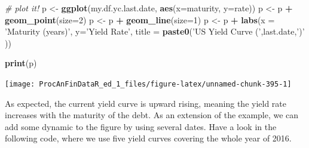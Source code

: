 \documentclass[11pt,]{book}
\newenvironment{Shaded}{\begin{snugshade}}{\end{snugshade}}
\newcommand{\KeywordTok}[1]{\textcolor[rgb]{0.27,0.27,0.27}{\textbf{#1}}}
\newcommand{\DataTypeTok}[1]{\textcolor[rgb]{0.27,0.27,0.27}{#1}}
\newcommand{\DecValTok}[1]{\textcolor[rgb]{0.06,0.06,0.06}{#1}}
\newcommand{\StringTok}[1]{\textcolor[rgb]{0.5,0.5,0.5}{#1}}
\newcommand{\CommentTok}[1]{\textcolor[rgb]{0.56,0.35,0.01}{\textit{#1}}}
\newcommand{\OperatorTok}[1]{\textcolor[rgb]{0.81,0.36,0.00}{\textbf{#1}}}
\newcommand{\NormalTok}[1]{#1}
\begin{document}
\begin{Shaded}
\begin{Highlighting}[]
\CommentTok{# plot it!}
\NormalTok{p <-}\StringTok{ }\KeywordTok{ggplot}\NormalTok{(my.df.yc.last.date, }\KeywordTok{aes}\NormalTok{(}\DataTypeTok{x=}\NormalTok{maturity, }\DataTypeTok{y=}\NormalTok{rate))}
\NormalTok{p <-}\StringTok{ }\NormalTok{p }\OperatorTok{+}\StringTok{ }\KeywordTok{geom_point}\NormalTok{(}\DataTypeTok{size=}\DecValTok{2}\NormalTok{)}
\NormalTok{p <-}\StringTok{ }\NormalTok{p }\OperatorTok{+}\StringTok{ }\KeywordTok{geom_line}\NormalTok{(}\DataTypeTok{size=}\DecValTok{1}\NormalTok{)}
\NormalTok{p <-}\StringTok{ }\NormalTok{p }\OperatorTok{+}\StringTok{ }\KeywordTok{labs}\NormalTok{(}\DataTypeTok{x =} \StringTok{'Maturity (years)'}\NormalTok{, }
              \DataTypeTok{y=}\StringTok{'Yield Rate'}\NormalTok{,}
              \DataTypeTok{title =} \KeywordTok{paste0}\NormalTok{(}\StringTok{'US Yield Curve ('}\NormalTok{,last.date,}\StringTok{')'}\NormalTok{ ))}

\KeywordTok{print}\NormalTok{(p)}
\end{Highlighting}
\end{Shaded}

\begin{center}\texttt{[image: ProcAnFinDataR\_ed\_1\_files/figure-latex/unnamed-chunk-395-1]} \end{center}

As expected, the current yield curve is upward rising, meaning the yield
rate increases with the maturity of the debt. As an extension of the
example, we can add some dynamic to the figure by using several dates.
Have a look in the following code, where we use five yield curves
covering the whole year of 2016.
\end{document}
